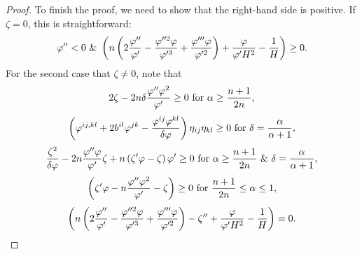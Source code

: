 \documentclass{amsart}
\begin{document}
\begin{proof}
To finish the proof, we need to show that the right-hand side is positive. If $\zeta=0$, this is straightforward:
\[\varphi''<0~\&~\left(n\left(2\frac{\varphi''}{\varphi'}-\frac{\varphi''^{2}\varphi}{\varphi'^{3}}+\frac{\varphi'''\varphi}{\varphi'^{2}}\right)+\frac{\varphi}{\varphi'H^2}-\frac{1}{H}\right)\geq 0.\]
For the second case that $\zeta\neq 0$, note that
$$2\zeta-2n\delta\frac{\varphi''\varphi^2}{\varphi'}\geq 0~\mbox{for}~\alpha\geq \frac{n+1}{2n},$$
$$\left(\varphi^{ij,kl}+2b^{il}\varphi^{jk}-\frac{\varphi^{ij}\varphi^{kl}}{\delta\varphi}\right)\eta_{ij}\eta_{kl}\geq0~\mbox{for}~\delta=\frac{\alpha}{\alpha+1},$$
$$\frac{\zeta^2}{\delta\varphi}-2n\frac{\varphi''\varphi}{\varphi'}\zeta+n\left(\zeta'\varphi-\zeta\right)\varphi'\geq 0~\mbox{for}~\alpha\geq\frac{n+1}{2n}~\&~\delta=\frac{\alpha}{\alpha+1},$$
$$\left(\zeta'\varphi-n\frac{\varphi''\varphi^2}{\varphi'}-\zeta\right)\geq 0~\mbox{for}~\frac{n+1}{2n}\leq \alpha\leq 1,$$
$$\left(n\left(2\frac{\varphi''}{\varphi'}-\frac{\varphi''^{2}\varphi}{\varphi'^{3}}+\frac{\varphi'''\varphi}{\varphi'^{2}}\right)-\zeta''+\frac{\varphi}{\varphi'H^2}-\frac{1}{H}\right)=0.$$
\end{proof}





\end{document}
